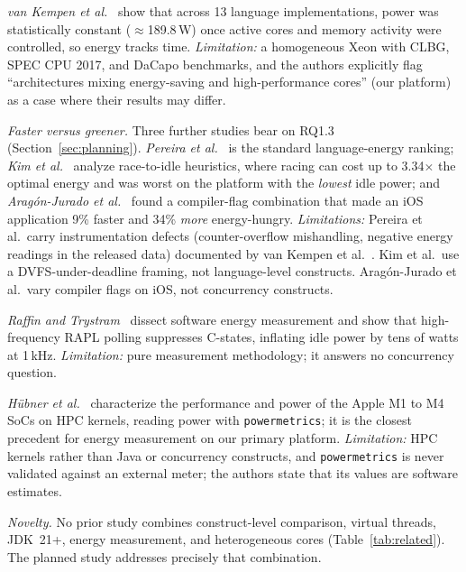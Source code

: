 \documentclass[sigconf,nonacm]{acmart}
\newcommand{\changed}[1]{#1}
\begin{document}
\emph{van Kempen et al.}~\cite{vankempen2025green} show that across 13 language implementations, power was statistically constant ($\approx$189.8\,W) once active cores and memory activity were controlled, so energy tracks time. \emph{Limitation:} a homogeneous Xeon with CLBG, SPEC CPU 2017, and DaCapo benchmarks, and the authors explicitly flag ``architectures mixing energy-saving and high-performance cores'' (our platform) as a case where their results may differ.

\changed{\emph{Faster versus greener.} Three further studies bear on RQ1.3 (Section~\ref{sec:planning}).} \emph{Pereira et al.}~\cite{pereira2017energy} is the standard language-energy ranking; \emph{Kim et al.}~\cite{kim2015racing} analyze race-to-idle heuristics, where racing can cost up to 3.34$\times$ the optimal energy and was worst on the platform with the \emph{lowest} idle power; and \emph{Arag{\'o}n-Jurado et al.}~\cite{aragonjurado2025faster} found a compiler-flag combination that made an iOS application 9\% faster and 34\% \emph{more} energy-hungry. \changed{\emph{Limitations:}} Pereira et al.\ carry instrumentation defects (counter-overflow mishandling, negative energy readings in the released data) documented by van Kempen et al.~\cite{vankempen2025green}. Kim et al.\ use a DVFS-under-deadline framing, not language-level constructs. Arag{\'o}n-Jurado et al.\ vary compiler flags on iOS, not concurrency constructs.

\emph{Raffin and Trystram}~\cite{raffin2025dissecting} dissect software energy measurement and show that high-frequency RAPL polling suppresses C-states, inflating idle power by tens of watts at 1\,kHz. \emph{Limitation:} pure measurement methodology; it answers no concurrency question.

\changed{\emph{H{\"u}bner et al.}~\cite{hubner2025apple} characterize the performance and power of the Apple M1 to M4 SoCs on HPC kernels, reading power with \texttt{powermetrics}; it is the closest precedent for energy measurement on our primary platform. \emph{Limitation:} HPC kernels rather than Java or concurrency constructs, and \texttt{powermetrics} is never validated against an external meter; the authors state that its values are software estimates.}

\emph{Novelty.} No prior study combines construct-level comparison, virtual threads, JDK~21+, \changed{energy measurement,} and heterogeneous cores (Table~\ref{tab:related}). \changed{The planned study addresses precisely that combination.}
\end{document}
